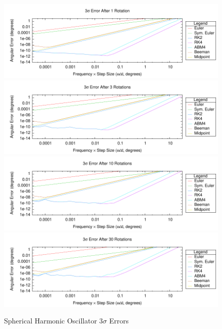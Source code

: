 \begin{description}
\begin{figure}[hbtp]
\centering
\includegraphics{figures/plot_RotationTestSHOSphere_revs_1_monte_err}
\vspace{2.0ex}
\includegraphics{figures/plot_RotationTestSHOSphere_revs_3_monte_err}
\vspace{2.0ex}
\includegraphics{figures/plot_RotationTestSHOSphere_revs_10_monte_err}
\vspace{2.0ex}
\includegraphics{figures/plot_RotationTestSHOSphere_revs_30_monte_err}
\caption{Spherical Harmonic Oscillator 3$\sigma$ Errors}
\label{fig:sho_sphere_err}
\end{figure} 


\end{description}
